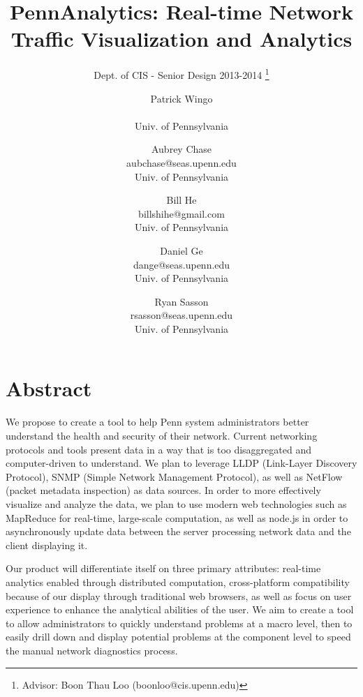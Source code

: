 \documentclass{sig-alternate}
\begin{document}
\title{PennAnalytics: Real-time Network Traffic Visualization and Analytics}
\subtitle{Dept. of CIS - Senior Design 2013-2014
    \thanks{Advisor: Boon Thau Loo (boonloo@cis.upenn.edu)}}
\author{Patrick Wingo\\ \\ Univ. of Pennsylvania
    \and Aubrey Chase\\ aubchase@seas.upenn.edu\\ Univ. of Pennsylvania
    \and Bill He\\ billshihe@gmail.com\\ Univ. of Pennsylvania
    \and Daniel Ge\\ dange@seas.upenn.edu\\ Univ. of Pennsylvania
    \and Ryan Sasson\\ rsasson@seas.upenn.edu\\ Univ. of Pennsylvania}

\maketitle

\section*{Abstract}

We propose to create a tool to help Penn system administrators better understand
the health and security of their network.  Current networking protocols and
tools present data in a way that is too disaggregated and computer-driven to
understand. We plan to leverage LLDP (Link-Layer Discovery Protocol), SNMP
(Simple Network Management Protocol), as well as NetFlow (packet metadata
inspection) as data sources. In order to more effectively visualize and analyze
the data, we plan to use modern web technologies such as MapReduce for
real-time, large-scale computation, as well as node.js in order to
asynchronously update data between the server processing network data and the
client displaying it.

Our product will differentiate itself on three primary attributes: real-time
analytics enabled through distributed computation, cross-platform compatibility
because of our display through traditional web browsers, as well as focus on
user experience to enhance the analytical abilities of the user. We aim to
create a tool to allow administrators to quickly understand problems at a macro
level, then to easily drill down and display potential problems at the component
level to speed the manual network diagnostics process.
\end{document}
